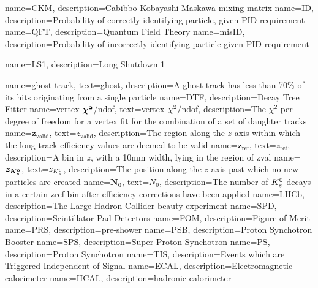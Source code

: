 
{
	name=CKM,
		description={Cabibbo-Kobayashi-Maskawa mixing matrix}
}
{
	name=ID,
		description={Probability of correctly identifying particle, given PID requirement}
}
{
	name=QFT,
		description={Quantum Field Theory}
}
{
	name=misID,
		description={Probability of incorrectly identifying particle given PID requirement}
}

{
	name=LS1,
		description={Long Shutdown 1}
}


{
	name=ghost track,
		text=ghost,
		description={A ghost track has less than 70\% of its hits originating from a single particle} 
}
{
	name=DTF,
		description={Decay Tree Fitter} 
}
{
	name=vertex $\mathbold{\chisq}$/ndof,
		text=vertex $\chi^2/$ndof,
		description={The $\chi^{2}$ per degree of freedom for a vertex fit for the combination of a set of daughter tracks} 
}
{
	name=$\mathbold{z_{\mathrm{valid}}}$,
		text=$z_{\mathrm{valid}}$,
		description={The region along the $z$-axis within which the long track efficiency values are deemed to be valid} 
}
{
	name=$\mathbold{z_{\mathrm{ref}}}$,
		text=$z_{\mathrm{ref}}$,
		description={A bin in $z$, with a 10mm width, lying in the region of \gls{zval}} 
}
{
	name=$\mathbold{z_{\KS}}$,
		text=$z_{{{K}^0_{s}}}$,
		description={The position along the $z$-axis past which no new \KS particles are created} 
}
{
	name=$\mathbold{N_{0}}$,
		text=$N_{0}$,
		description={The number of ${{K}^0_{s}}$ decays in a certain \gls{zref} bin after efficiency corrections have been applied}}
{
	name=LHCb,
		description={The Large Hadron Collider beauty experiment}
}
{
	name=SPD,
		description={Scintillator Pad Detectors}
}
{
	name=FOM,
		description={Figure of Merit}
}                                    
{
	name=PRS,
		description={pre-shower}
}                                    
{
	name=PSB,
		description={Proton Synchotron Booster}
}
{
	name=SPS,
		description={Super Proton Synchotron}
}
{
	name=PS,
		description={Proton Synchotron}
}
{
	name=TIS,
		description={Events which are Triggered Independent of Signal}
}
{
	name=ECAL,
		description={Electromagnetic calorimeter}
}
{
	name=HCAL,
		description={hadronic calorimeter}
}                                    

